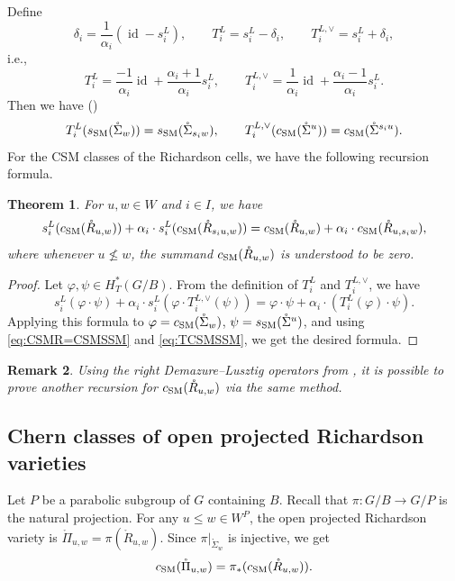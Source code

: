 \documentclass[12pt]{amsart}
\newtheorem{Th}{Theorem}[section]
\newtheorem{Rmk}[Th]{Remark}
\def\CSM{c_{\rm SM}}
\def\SSM{s_{\rm SM}}
\def\T{T}
\def\id{\operatorname{id}}
\begin{document}
Define
$$\delta_i=\frac{1}{\alpha_i}(\id-s_i^L),\qquad \T_i^L=s_i^L-\delta_i,\qquad \T_i^{L,\vee} = s_i^L+\delta_i,$$
i.e.,
\begin{equation}\label{equ:leftoper}
    \T_i^L = \frac{-1}{\alpha_i}\id+\frac{\alpha_i+1}{\alpha_i}s_i^L,\qquad 
\T_i^{L,\vee} = \frac{1}{\alpha_i}\id+\frac{\alpha_i-1}{\alpha_i}s_i^L.
\end{equation}
Then we have (\cite[Theorem 4.3]{MNS})
\begin{equation}\label{eq:TCSMSSM}
 \T_i^L(\SSM(\mathring{\Sigma}_{w}))=\SSM(\mathring{\Sigma}_{s_iw}),\qquad 
\T_i^{L,\vee}(\CSM(\mathring{\Sigma}^{u}))=\CSM(\mathring{\Sigma}^{s_iu}).
\end{equation}
For the CSM classes of the Richardson cells, we have the following recursion formula.
\begin{Th}\label{thm:csmrec}
For $u,w\in W$ and $i\in I$, we have
\begin{align}\label{th4.1}
s_i^L(\CSM(\mathring{R}_{u,w}))
+ \alpha_i\cdot s_i^L(\CSM(\mathring{R}_{s_iu,w}))
= \CSM(\mathring{R}_{u,w})
+ \alpha_i\cdot\CSM(\mathring{R}_{u,s_iw}),
\end{align}
where whenever $u\not\leq w$, the summand $\CSM(\mathring{R}_{u,w})$ is understood to be zero. 
\end{Th}
\begin{proof}
Let $\varphi,\psi\in H_T^*(G/B)$. From the definition of $\T_i^L$ and $\T_i^{L,\vee}$, we have
$$s_i^L(\varphi\cdot \psi)+\alpha_i\cdot s_i^L(\varphi\cdot \T_i^{L,\vee}(\psi))
=\varphi\cdot\psi+\alpha_i\cdot(\T_i^L(\varphi)\cdot\psi).$$
Applying this formula to $\varphi=\CSM(\mathring{\Sigma}_{w})$, $\psi=\SSM(\mathring{\Sigma}^{u})$, and using   \eqref{eq:CSMR=CSMSSM} and \eqref{eq:TCSMSSM}, we get the desired formula. 
\end{proof}
\begin{Rmk}
    Using the right Demazure--Lusztig operators from \cite{MNS}, it is possible to prove another recursion for $\CSM(\mathring{R}_{u,w})$ via the same method.
\end{Rmk}

\subsection{Chern classes of open projected Richardson varieties}
Let $P$ be a parabolic subgroup of $G$ containing $B$. Recall that $\pi:G/B\rightarrow G/P$ is the natural projection. For any $u\leq w\in W^P$, the open projected Richardson variety is $\mathring{\Pi}_{u,w}=\pi(\mathring{R}_{u,w})$. Since $\pi|_{\mathring{\Sigma}_{w}}$ is injective, we get
\[\CSM(\mathring{\Pi}_{u,w})=\pi_*(\CSM(\mathring{R}_{u,w})).\]
\end{document}
